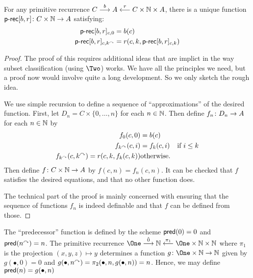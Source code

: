 \begin{theorem}
	For any primitive recurrence $C \stackrel{b}{\longrightarrow} A \stackrel{r}{\longleftarrow} C\times \mathbb N \times A$, there is a unique
	function ${\mathord{\textsf{p-rec}}[b,r]}\colon{C\times \mathbb N}\to{A}$ satisfying: 
	\begin{align*}
		\mathord{\textsf{p-rec}}[b,r]_{c,0} &= b(c)\\
		\mathord{\textsf{p-rec}}[b,r]_{c,k^\curvearrowright} &= r(c,k,\mathord{\textsf{p-rec}}[b,r]_{c,k})
	\end{align*}

	\begin{proof}
		The proof of this requires additional ideas that are implict in the way subset classification (using $\Two$) works. We have all the principles we need, but a proof now would involve quite a long development. So we only sketch the rough idea.
		
		We use simple recursion to define a sequence of ``approximations'' of the desired function. First, let $D_n = C\times \{0,\dotsc,n\}$ for each $n\in\mathbb N$. Then define 
		${f_n}\colon{D_n}\to{A}$ for each $n\in \mathbb N$ by
		\begin{align*}
			f_0(c,0) &= b(c)\\
			f_{k^\curvearrowright}(c,i) &= f_k(c,i) & \text{if $i\leq k$}\\
			f_{k^\curvearrowright}(c,k^\curvearrowright) = 	r(c,k,f_k(c,k)) & \text{otherwise}.
		\end{align*}
		Then define ${f}\colon{C\times \mathbb N}\to{A}$ by $f(c,n) = f_n(c,n)$. 
		It can be checked that $f$ satisfies the desired equations, and that no other function does.
		
		The technical part of the proof is mainly concerned with ensuring that the sequence of functions $f_n$ is indeed definable and that $f$ can be defined from those.  
	\end{proof}
\end{theorem}

\begin{example}
	The ``predecessor'' function is defined by the scheme $\mathord{\textsf{pred}}(0)=0$ and $\mathord{\textsf{pred}}(n^\curvearrowright) = n$. 
	The primitive recurrence
	$\One \stackrel{\hat0}{\longrightarrow} \NN \stackrel{\pi_1}{\longleftarrow} \One\times\NN\times\NN$ where $\pi_1$ is the projection $(x,y,z)\mapsto y$ determines a function $\fromto g{\One\times \NN}{\NN}$ given by
	$g(\bullet, 0) = 0$ and $g(\bullet,n^\curvearrowright) = \pi_2(\bullet, n, g(\bullet, n)) = n$. Hence, we may define $\mathord{\textsf{pred}}(n) = g(\bullet, n)$
\end{example}

